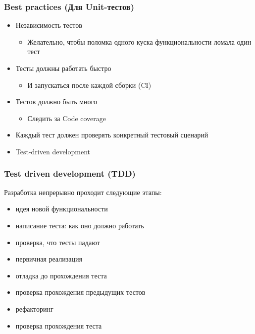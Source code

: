 \documentclass{beamer}
\begin{document}
\begin{frame}
  \frametitle{Best practices (Для Unit-тестов)}
  \begin{itemize}
    \item Независимость тестов
    \begin{itemize}
      \item Желательно, чтобы поломка одного куска функциональности ломала один тест
    \end{itemize}
    \item Тесты должны работать быстро
    \begin{itemize}
      \item И запускаться после каждой сборки (CI)
    \end{itemize}
    \item Тестов должно быть много
    \begin{itemize}
      \item Следить за Code coverage
    \end{itemize}
    \item Каждый тест должен проверять конкретный тестовый сценарий
    \item Test-driven development
  \end{itemize}
\end{frame}

\begin{frame}
  \frametitle{Test driven development (TDD)}
  Разработка непрерывно проходит следующие этапы:
  \begin{itemize}
    \item идея новой функциональности
    \item написание теста: как оно должно работать
    \item проверка, что тесты падают
    \item первичная реализация
    \item отладка до прохождения теста
    \item проверка прохождения предыдущих тестов
    \item рефакторинг
    \item проверка прохождения теста
  \end{itemize}
\end{frame}
\end{document}
